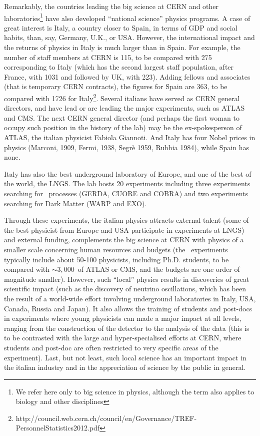 Remarkably, the countries leading the big science at CERN and other laboratories\footnote{We refer here only to big science in physics, although the term also applies to biology and other disciplines} have also developed ``national science'' physics programs. A case of great interest is Italy, a country closer to Spain, in terms of GDP and social habits, than, say, Germany, U.K., or USA. However, the international impact and the returns of physics in Italy is much larger than in Spain. For example, the number of staff members at CERN is 115, to be compared with 275 corresponding to Italy (which has the second largest staff population, after France, with 1031 and followed by UK, with 223). Adding fellows and associates (that is temporary CERN contracts), the figures for Spain are 363, to be compared with 1726 for Italy\footnote{http://council.web.cern.ch/council/en/Governance/TREF-PersonnelStatistics2012.pdf}. Several italians have served as CERN general directors, and have lead or are leading the major experiments, such as ATLAS and CMS. The next CERN general director (and perhaps the first woman to occupy such position in the history of the lab) may be the ex-spokesperson of ATLAS, the italian physicist Fabiola Giannoti. And Italy has four Nobel prices in physics (Marconi, 1909, Fermi, 1938, Segrè 1959, Rubbia 1984), while Spain has none. 

Italy has also the best underground laboratory of Europe, and one of the best of the world, the LNGS. The lab hosts 20 experiments including three experiments searching for \bbonu\ processes (GERDA, CUORE and COBRA) and two experiments searching for Dark Matter (WARP and EXO). 

Through these experiments, the italian physics attracts external talent (some of the best physicist from Europe and USA participate in experiments at LNGS) and external funding, complements the big science at CERN with physics of a smaller scale concerning human resources and budgets (the \bbonu\ experiments typically include about 50-100 physicists, including Ph.D. students, to be compared with $\sim 3,000$~of ATLAS or CMS, and the budgets are one order of magnitude smaller). However, such ``local'' physics results in discoveries of great scientific impact (such as the discovery of neutrino oscillations, which has been the result of a world-wide effort involving underground laboratories in Italy, USA, Canada, Russia and Japan). It also allows the training of students and post-docs in experiments where young physicists can made a major impact at all levels, ranging from the construction of the detector to the analysis of the data (this is to be contrasted with the large and hyper-specialised efforts at CERN, where students and post-doc are often restricted to very specific areas of the experiment). Last, but not least, such local science has an important impact in the italian industry and in the appreciation of science by the public in general. 


